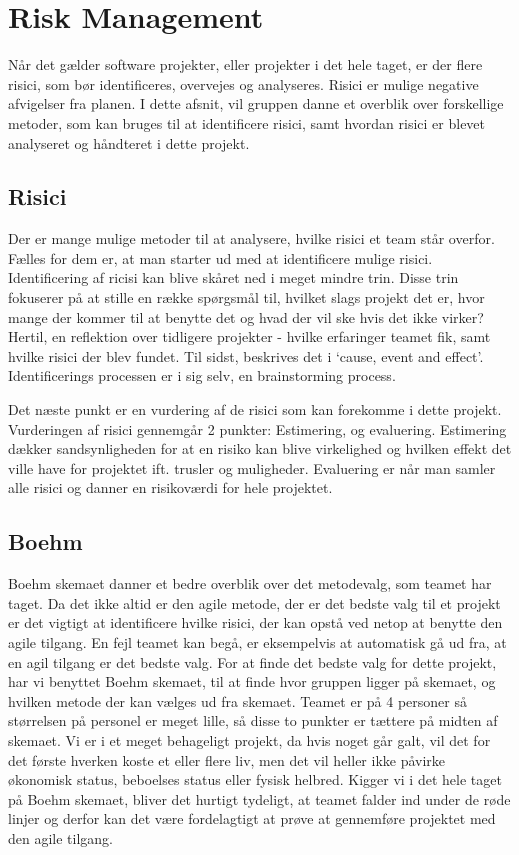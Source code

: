 \chapter{Risk Management}\label{ch:Risk Management}

Når det gælder software projekter, eller projekter i det hele taget, er der flere risici, som bør identificeres, overvejes og analyseres. Risici er mulige negative afvigelser fra planen.\cite{SlideRiskAnalysis} I dette afsnit, vil gruppen danne et overblik over forskellige metoder, som kan bruges til at identificere risici, samt hvordan risici er blevet analyseret og håndteret i dette projekt.

\section{Risici}

Der er mange mulige metoder til at analysere, hvilke risici et team står overfor. Fælles for dem er, at man starter ud med at identificere mulige risici.
Identificering af ricisi kan blive skåret ned i meget mindre trin.\cite{SlideRiskAnalysis} Disse trin fokuserer på at stille en række spørgsmål til, hvilket slags projekt det er, hvor mange der kommer til at benytte det og hvad der vil ske hvis det ikke virker? Hertil, en reflektion over tidligere projekter - hvilke erfaringer teamet fik, samt hvilke risici der blev fundet. Til sidst, beskrives det i ‘cause, event and effect’. Identificerings processen er i sig selv, en brainstorming process.

Det næste punkt er en vurdering af de risici som kan forekomme i dette projekt. Vurderingen af risici gennemgår 2 punkter: Estimering, og evaluering. Estimering dækker sandsynligheden for at en risiko kan blive virkelighed og hvilken effekt det ville have for projektet ift. trusler og muligheder. Evaluering er når man samler alle risici og danner en risikoværdi for hele projektet.

\section{Boehm}

Boehm skemaet danner et bedre overblik over det metodevalg, som teamet har taget. Da det ikke altid er den agile metode, der er det bedste valg til et projekt er det vigtigt at identificere hvilke risici, der kan opstå ved netop at benytte den agile tilgang. En fejl teamet kan begå, er eksempelvis at automatisk gå ud fra, at en agil tilgang er det bedste valg. For at finde det bedste valg for dette projekt, har vi benyttet Boehm skemaet, til at finde hvor gruppen ligger på skemaet, og hvilken metode der kan vælges ud fra skemaet.
Teamet er på 4 personer så størrelsen på personel er meget lille, så disse to punkter er tættere på midten af skemaet. Vi er i et meget behageligt projekt, da hvis noget går galt, vil det for det første hverken koste et eller flere liv, men det vil heller ikke påvirke økonomisk status, beboelses status eller fysisk helbred. Kigger vi i det hele taget på Boehm skemaet, bliver det hurtigt tydeligt, at teamet falder ind under de røde linjer og derfor kan det være fordelagtigt at prøve at gennemføre projektet med den agile tilgang.

